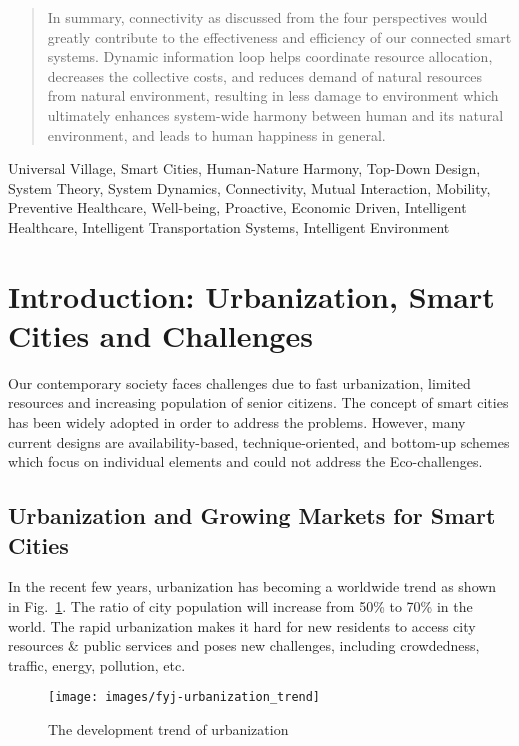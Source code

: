 \documentclass[letterpaper, twocolumn, 10pt, conference]{IEEEtran}
\begin{document}
\begin{abstract}
In summary, connectivity as discussed from the four perspectives would greatly contribute to the effectiveness and efficiency of our connected smart systems. Dynamic information loop helps coordinate resource allocation, decreases the collective costs, and reduces demand of natural resources from natural environment, resulting in less damage to environment which ultimately enhances system-wide harmony between human and its natural environment, and leads to human happiness in general.

\end{abstract}

\begin{IEEEkeywords}
	
Universal Village, Smart Cities, Human-Nature Harmony, Top-Down Design, System Theory, System Dynamics, Connectivity, Mutual Interaction, Mobility, Preventive Healthcare, Well-being, Proactive, Economic Driven, Intelligent Healthcare, Intelligent Transportation Systems, Intelligent Environment

\end{IEEEkeywords}

\section{Introduction: Urbanization, Smart Cities and Challenges}
\label{sec:Introduction}

Our contemporary society faces challenges due to fast urbanization, limited resources and increasing population of senior citizens. The concept of smart cities has been widely adopted in order to address the problems. However, many current designs are availability-based, technique-oriented, and bottom-up schemes which focus on individual elements and could not address the Eco-challenges.

\subsection{Urbanization and Growing Markets for Smart Cities}
\label{ssec:growing_markets}

In the recent few years, urbanization has becoming a worldwide trend as shown in Fig.~\ref{fig:fyj:urbanization_trend}. The ratio of city population will increase from 50\% to 70\% in the world. The rapid urbanization makes it hard for new residents to access city resources \& public services and poses new challenges, including crowdedness, traffic, energy, pollution, etc.

\begin{figure}[h!]
        \centering
        \texttt{[image: images/fyj-urbanization\_trend]}
        \caption{The development trend of urbanization}
        \label{fig:fyj:urbanization_trend}
\end{figure}
\end{document}
